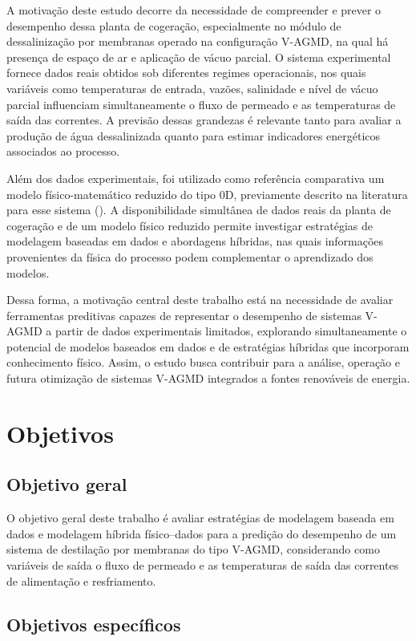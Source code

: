 A motivação deste estudo decorre da necessidade de compreender e prever o desempenho dessa planta de cogeração, especialmente no módulo de dessalinização por membranas operado na configuração V-AGMD, na qual há presença de espaço de ar e aplicação de vácuo parcial. O sistema experimental fornece dados reais obtidos sob diferentes regimes operacionais, nos quais variáveis como temperaturas de entrada, vazões, salinidade e nível de vácuo parcial influenciam simultaneamente o fluxo de permeado e as temperaturas de saída das correntes. A previsão dessas grandezas é relevante tanto para avaliar a produção de água dessalinizada quanto para estimar indicadores energéticos associados ao processo.

Além dos dados experimentais, foi utilizado como referência comparativa um modelo físico-matemático reduzido do tipo 0D, previamente descrito na literatura para esse sistema (\cite{Lisboa2024}). A disponibilidade simultânea de dados reais da planta de cogeração e de um modelo físico reduzido permite investigar estratégias de modelagem baseadas em dados e abordagens híbridas, nas quais informações provenientes da física do processo podem complementar o aprendizado dos modelos.

Dessa forma, a motivação central deste trabalho está na necessidade de avaliar ferramentas preditivas capazes de representar o desempenho de sistemas V-AGMD a partir de dados experimentais limitados, explorando simultaneamente o potencial de modelos baseados em dados e de estratégias híbridas que incorporam conhecimento físico. Assim, o estudo busca contribuir para a análise, operação e futura otimização de sistemas V-AGMD integrados a fontes renováveis de energia.

\section{Objetivos}

\subsection{Objetivo geral}

O objetivo geral deste trabalho é avaliar estratégias de modelagem baseada em dados e modelagem híbrida físico--dados para a predição do desempenho de um sistema de destilação por membranas do tipo V-AGMD, considerando como variáveis de saída o fluxo de permeado e as temperaturas de saída das correntes de alimentação e resfriamento.

\subsection{Objetivos específicos}

